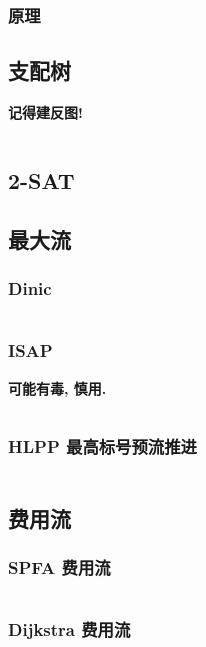 \documentclass[a4paper, twoside]{article}
\begin{document}
\begin{multicols}{2}
				\subsubsection{原理}
					

			
			\subsection{支配树}
				\textbf{记得建反图!}
				\inputminted{cpp}{../src/graph/支配树.cpp}

			\subsection{2-SAT}
				

			\subsection{最大流}
				\subsubsection{Dinic}
					\inputminted{cpp}{../src/graph/Dinic.cpp}

				\subsubsection{ISAP}
					\textbf{可能有毒, 慎用.}
					\inputminted{cpp}{../src/graph/ISAP.cpp}

				\subsubsection{HLPP 最高标号预流推进}
					\inputminted{cpp}{../src/graph/HLPP.cpp}
			
			\subsection{费用流}
				\subsubsection{SPFA 费用流}
					\inputminted{cpp}{../src/graph/SPFA费用流.cpp}

				\subsubsection{Dijkstra 费用流}
					
				

\end{multicols}
\end{document}
